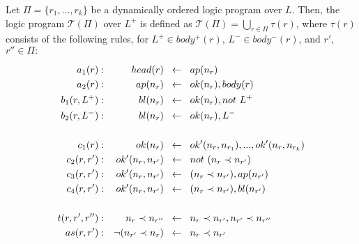 \begin{definition}
  Let $\Pi = \{r_1, ..., r_k\}$ be a dynamically ordered logic program over $L$.
  Then, the logic program $\mathcal{T}(\Pi)$ over $L^+$ is defined as
  $\mathcal{T}(\Pi) = \bigcup_{r \in \Pi}\tau(r)$, where $\tau(r)$ consists of the
  following rules, for $L^+ \in body^+(r)$, $L^- \in body^-(r)$, and $r'$,
  $r'' \in \Pi:$\\
  \begin{minipage}{0.8\textwidth}
    \begin{align*}
      a_1(r): && head(r) \hspace*{0.2cm}&\leftarrow \hspace*{0.2cm} ap(n_r)\\
      a_2(r): && ap(n_r) \hspace*{0.2cm}&\leftarrow \hspace*{0.2cm} ok(n_r), body(r)\\
      b_1(r, L^+): && bl(n_r) \hspace*{0.2cm}&\leftarrow \hspace*{0.2cm} ok(n_r), not~L^+\\
      b_2(r, L^-): && bl(n_r) \hspace*{0.2cm}&\leftarrow \hspace*{0.2cm} ok(n_r), L^-\\
      \\
      c_1(r): && ok(n_r) \hspace*{0.2cm}&\leftarrow \hspace*{0.2cm} ok'(n_r, n_{r_1}), ..., ok'(n_r, n_{r_k})\\
      c_2(r, r'): && ok'(n_r, n_{r'}) \hspace*{0.2cm}&\leftarrow \hspace*{0.2cm} not~(n_r \prec n_{r'})\\
      c_3(r, r'): && ok'(n_r, n_{r'}) \hspace*{0.2cm}&\leftarrow \hspace*{0.2cm} (n_r \prec n_{r'}), ap(n_{r'})\\
      c_4(r, r'): && ok'(n_r, n_{r'}) \hspace*{0.2cm}&\leftarrow \hspace*{0.2cm} (n_r \prec n_{r'}), bl(n_{r'})\\
      \\
      t(r, r', r''): && n_r \prec n_{r''} \hspace*{0.2cm}&\leftarrow \hspace*{0.2cm} n_r \prec n_{r'}, n_{r'} \prec n_{r''}\\
      as(r, r'): && \neg (n_{r'} \prec n_{r}) \hspace*{0.2cm}&\leftarrow \hspace*{0.2cm} n_r \prec n_{r'}
    \end{align*}
  \end{minipage}
\end{definition}

